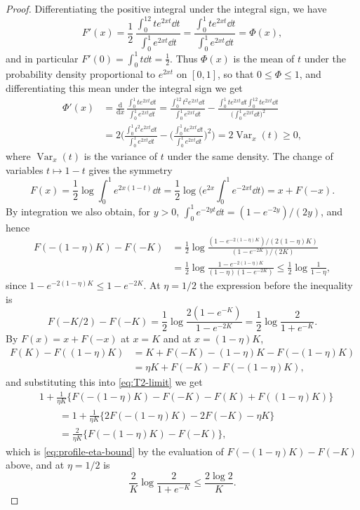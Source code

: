 \begin{proof}
Differentiating the positive integral under the integral sign, we have
\[
 F'(x)=\frac12\,\frac{\int_0^12te^{2xt}\dd t}{\int_0^1e^{2xt}\dd t}
 =\frac{\int_0^1t e^{2xt}\dd t}{\int_0^1e^{2xt}\dd t}
 =\Phi(x),
\]
and in particular $F'(0)=\int_0^1t\dd t=\frac12$.
Thus $\Phi(x)$ is the mean of $t$ under the probability density
proportional to $e^{2xt}$ on $[0,1]$, so that $0\le\Phi\le1$, and
differentiating this mean under the integral sign we get
\begin{align}
 \Phi'(x)
 &=\frac{\mathrm d}{\mathrm dx}\,\frac{\int_0^1te^{2xt}\dd t}{\int_0^1e^{2xt}\dd t}
 =\frac{\int_0^12t^2e^{2xt}\dd t}{\int_0^1e^{2xt}\dd t}
  -\frac{\int_0^1te^{2xt}\dd t\int_0^12te^{2xt}\dd t}{\bigl(\int_0^1e^{2xt}\dd t\bigr)^2}\nonumber\\
 &=2\bigg(\frac{\int_0^1t^2e^{2xt}\dd t}{\int_0^1e^{2xt}\dd t}
  -\Big(\frac{\int_0^1te^{2xt}\dd t}{\int_0^1e^{2xt}\dd t}\Big)^2\bigg)
 =2\operatorname{Var}_x(t)\ge0,\label{eq:Phi-variance}
\end{align}
where $\operatorname{Var}_x(t)$ is the variance of $t$ under the same
density.
The change of variables $t\mapsto1-t$ gives the symmetry
\[
 F(x)=\frac12\log\int_0^1e^{2x(1-t)}\dd t
 =\frac12\log\Big(e^{2x}\int_0^1e^{-2xt}\dd t\Big)
 =x+F(-x).
\]
By integration we also obtain, for $y>0$, $\int_0^1e^{-2yt}\dd t=(1-e^{-2y})/(2y)$, and hence
\begin{align*}
 F(-(1-\eta)K)-F(-K)
 &=\frac12\log\frac{(1-e^{-2(1-\eta)K})/(2(1-\eta)K)}{(1-e^{-2K})/(2K)}\\
 &=\frac12\log\frac{1-e^{-2(1-\eta)K}}{(1-\eta)(1-e^{-2K})}
 \le\frac12\log\frac1{1-\eta},
\end{align*}
since $1-e^{-2(1-\eta)K}\le1-e^{-2K}$. At $\eta=1/2$ the expression
before the inequality is
\[
 F(-K/2)-F(-K)=\frac12\log\frac{2(1-e^{-K})}{1-e^{-2K}}
 =\frac12\log\frac2{1+e^{-K}}.
\]
By $F(x)=x+F(-x)$ at $x=K$ and at $x=(1-\eta)K$,
\begin{align*}
 F(K)-F((1-\eta)K)&=K+F(-K)-(1-\eta)K-F(-(1-\eta)K)\\
 &=\eta K+F(-K)-F(-(1-\eta)K),
\end{align*}
and substituting this into \eqref{eq:T2-limit} we get
\begin{align*}
 &1+\frac1{\eta K}\{F(-(1-\eta)K)-F(-K)-F(K)+F((1-\eta)K)\}\\
 &\qquad=1+\frac1{\eta K}\{2F(-(1-\eta)K)-2F(-K)-\eta K\}\\
 &\qquad=\frac2{\eta K}\{F(-(1-\eta)K)-F(-K)\},
\end{align*}
which is \eqref{eq:profile-eta-bound} by the evaluation of
$F(-(1-\eta)K)-F(-K)$ above, and at $\eta=1/2$ is
\[
 \frac2K\log\frac2{1+e^{-K}}\le\frac{2\log2}K.
\]
\end{proof}

